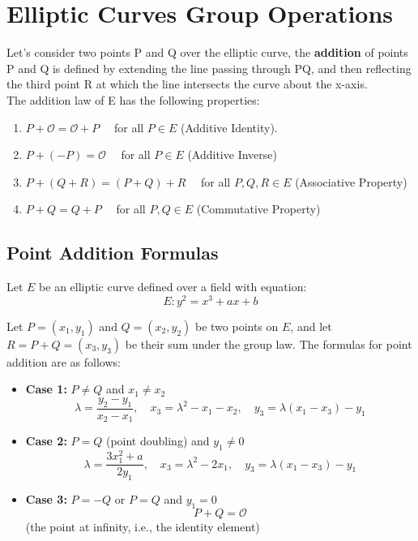 \documentclass[12pt,a4paper]{report}
\begin{document}
\section{Elliptic Curves Group Operations}
Let's consider two points P and Q over the elliptic curve, the \textbf{addition} of points P and Q is defined by extending the line passing through PQ, and then reflecting the third point R at which the line intersects the curve about the x-axis.\\
The addition law of E has the following properties:
\begin{enumerate}
    \item $P + \mathcal{O} = \mathcal{O} + P \quad$ for all $P \in E$ (Additive Identity).
    \item $P + (-P) = \mathcal{O} \quad $ for all $P \in E$ (Additive Inverse)
    \item $P+(Q+R) = (P+Q)+R \quad$ for all $P, Q, R \in E$ (Associative Property)
    \item $P+Q = Q+P \quad$ for all $P,Q \in E$ (Commutative Property)
\end{enumerate}
\subsection*{Point Addition Formulas}

Let $E$ be an elliptic curve defined over a field with equation:
\[
E : y^2 = x^3 + ax + b
\]

Let $P = (x_1, y_1)$ and $Q = (x_2, y_2)$ be two points on $E$, and let $R = P + Q = (x_3, y_3)$ be their sum under the group law. The formulas for point addition are as follows:

\begin{itemize}
  \item \textbf{Case 1:} $P \neq Q$ and $x_1 \neq x_2$
  \[
  \lambda = \frac{y_2 - y_1}{x_2 - x_1}, \quad
  x_3 = \lambda^2 - x_1 - x_2, \quad
  y_3 = \lambda(x_1 - x_3) - y_1
  \]

  \item \textbf{Case 2:} $P = Q$ (point doubling) and $y_1 \neq 0$
  \[
  \lambda = \frac{3x_1^2 + a}{2y_1}, \quad
  x_3 = \lambda^2 - 2x_1, \quad
  y_3 = \lambda(x_1 - x_3) - y_1
  \]

  \item \textbf{Case 3:} $P = -Q$ or $P = Q$ and $y_1 = 0$  
  \[
  P + Q = \mathcal{O}
  \]
  (the point at infinity, i.e., the identity element)
\end{itemize}
\end{document}
